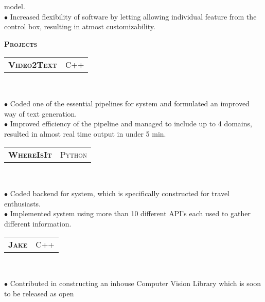 \documentclass[10pt,a4paper,oneside]{article}
\begin{document}
\begin{minipage}[t]{0.63\textwidth}
\begin{adjustwidth}{7pt}{0pt}
{            model.\\
        $\bullet$ Increased flexibility of software by letting allowing individual feature from the control box, resulting in atmost
    customizability.}\\
        \end{adjustwidth}
        \textcolor{light-gray}{\textbf{\large P\textsc{rojects}}}
        \vspace{10pt}\\
        \begin{tabular}{c|c}
            \textbf{\normalsize V\textsc{ideo}2T\textsc{ext}}
            &\textmd{\normalsize C\textsc{++}}
        \end{tabular}\\
        \vspace{-4mm}
        \begin{adjustwidth}{7pt}{0pt}
            {\footnotesize $\bullet$ Coded one of the essential pipelines for system and formulated an improved way of text generation.\\
            $\bullet$ Improved efficiency of the pipeline and managed to include up to 4 domains, resulted in almost real time output in
        under 5 min. }\\ 
        \end{adjustwidth}
        \begin{tabular}{c|c}
            \textbf{\normalsize W\textsc{here}I\textsc{s}I\textsc{t}}
            &\textmd{\normalsize P\textsc{ython}}
        \end{tabular}\\
         \vspace{-4mm}
        \begin{adjustwidth}{7pt}{0pt}
            {\footnotesize $\bullet$ Coded backend for system, which is specifically constructed for travel enthusiasts.\\ 
            $\bullet$ Implemented system using more than 10 different API's each used to gather different information.}\\ 
        \end{adjustwidth}
        \begin{tabular}{c|c}
            \textbf{\normalsize J\textsc{ake}}
            &\textmd{\normalsize C\textsc{++}}
        \end{tabular}\\
         \vspace{-4mm}
        \begin{adjustwidth}{7pt}{0pt}
            {\footnotesize $\bullet$ Contributed in constructing an inhouse Computer Vision Library which is soon to be released as open
}
\end{adjustwidth}
\end{minipage}
\end{document}
